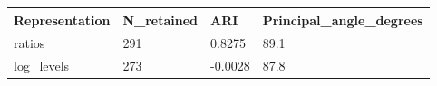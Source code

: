 \begin{tabular}{llll}
\toprule
Representation & N\_retained & ARI & Principal\_angle\_degrees \\
\midrule
ratios & 291 & 0.8275 & 89.1 \\
log\_levels & 273 & -0.0028 & 87.8 \\
\bottomrule
\end{tabular}
